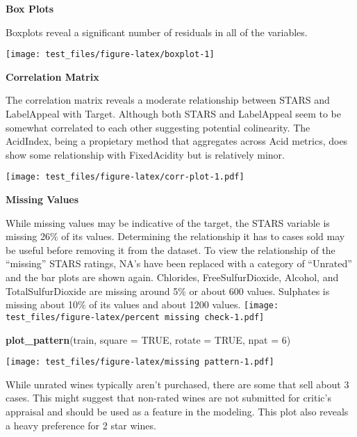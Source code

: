 \documentclass[
]{article}
\newenvironment{Shaded}{\begin{snugshade}}{\end{snugshade}}
\newcommand{\AttributeTok}[1]{\textcolor[rgb]{0.13,0.29,0.53}{#1}}
\newcommand{\ConstantTok}[1]{\textcolor[rgb]{0.56,0.35,0.01}{#1}}
\newcommand{\DecValTok}[1]{\textcolor[rgb]{0.00,0.00,0.81}{#1}}
\newcommand{\FunctionTok}[1]{\textcolor[rgb]{0.13,0.29,0.53}{\textbf{#1}}}
\newcommand{\NormalTok}[1]{#1}
\begin{document}
\textbf{Box Plots}

Boxplots reveal a significant number of residuals in all of the
variables. \newline

\begin{center}\texttt{[image: test\_files/figure-latex/boxplot-1]} \end{center}

\textbf{Correlation Matrix}

The correlation matrix reveals a moderate relationship between STARS and
LabelAppeal with Target. Although both STARS and LabelAppeal seem to be
somewhat correlated to each other suggesting potential colinearity. The
AcidIndex, being a propietary method that aggregates across Acid
metrics, does show some relationship with FixedAcidity but is relatively
minor.

\texttt{[image: test\_files/figure-latex/corr-plot-1.pdf]}

\textbf{Missing Values}

While missing values may be indicative of the target, the STARS variable
is missing 26\% of its values. Determining the relationship it has to
cases sold may be useful before removing it from the dataset. To view
the relationship of the ``missing'' STARS ratings, NA's have been
replaced with a category of ``Unrated'' and the bar plots are shown
again. Chlorides, FreeSulfurDioxide, Alcohol, and TotalSulfurDioxide are
missing around 5\% or about 600 values. Sulphates is missing about 10\%
of its values and about 1200 values.
\texttt{[image: test\_files/figure-latex/percent missing check-1.pdf]}

\begin{Shaded}
\begin{Highlighting}[]
\FunctionTok{plot\_pattern}\NormalTok{(train, }\AttributeTok{square =} \ConstantTok{TRUE}\NormalTok{, }\AttributeTok{rotate =} \ConstantTok{TRUE}\NormalTok{, }\AttributeTok{npat =} \DecValTok{6}\NormalTok{)}
\end{Highlighting}
\end{Shaded}

\texttt{[image: test\_files/figure-latex/missing pattern-1.pdf]}

While unrated wines typically aren't purchased, there are some that sell
about 3 cases. This might suggest that non-rated wines are not submitted
for critic's appraisal and should be used as a feature in the modeling.
This plot also reveals a heavy preference for 2 star wines.
\end{document}
